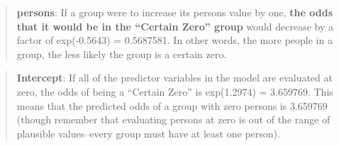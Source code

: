 \documentclass[ngerman,a4paper,]{scrartcl}
\theoremstyle{definition}
\theoremstyle{definition}
\theoremstyle{definition}
\theoremstyle{remark}
\begin{document}
\begin{quote}
\textbf{persons}: If a group were to increase its persons value by one, \textbf{the odds that it would be in the \enquote{Certain Zero} group} would decrease by a factor of exp(-0.5643) = 0.5687581. In other words, the more people in a group, the less likely the group is a certain zero.
\end{quote}

\begin{quote}
\textbf{Intercept}: If all of the predictor variables in the model are evaluated at zero, the odds of being a \enquote{Certain Zero} is exp(1.2974) = 3.659769. This means that the predicted odds of a group with zero persons is 3.659769 (though remember that evaluating persons at zero is out of the range of plausible values--every group must have at least one person).
\end{quote}
\end{document}
